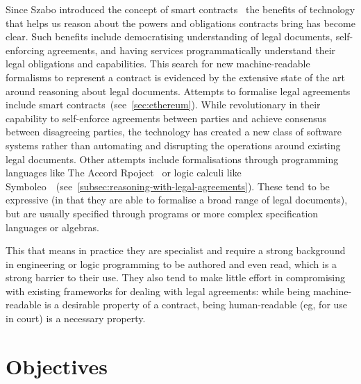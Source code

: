 Since Szabo introduced the concept of smart contracts~\cite{szabo1997smart-contracts} the benefits of technology that helps us reason about the powers and obligations contracts bring has become clear.
Such benefits include democratising understanding of legal documents, self-enforcing agreements, and having services programmatically understand their legal obligations and capabilities.
This search for new machine-readable formalisms to represent a contract is evidenced by the extensive state of the art around reasoning about legal documents.
Attempts to formalise legal agreements include smart contracts~(see~\autoref{sec:ethereum}).
While revolutionary in their capability to self-enforce agreements between parties and achieve consensus between disagreeing parties, the technology has created a new class of software systems rather than automating and disrupting the operations around existing legal documents.
Other attempts include formalisations through programming languages like The Accord Rpoject~\cite{accordHomepage} or logic calculi like Symboleo~\cite{symboleo2020}~(see~\autoref{subsec:reasoning-with-legal-agreements}).
These tend to be expressive (in that they are able to formalise a broad range of legal documents),
but are usually specified through programs or more complex specification languages or algebras.

This that means in practice they are specialist and require a strong background in engineering or logic programming to be authored and even read, which is a strong barrier to their use.
They also tend to make little effort in compromising with existing frameworks for dealing with legal agreements: while being machine-readable is a desirable property of a contract, being human-readable (eg, for use in court) is a necessary property.


\section{Objectives}\label{sec:objectives}



